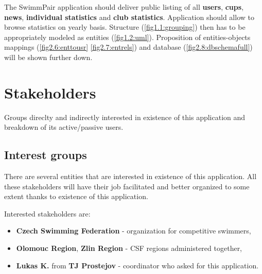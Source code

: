 The SwimmPair application should deliver public listing of all \textbf{users}, \textbf{cups}, \textbf{news}, \textbf{individual statistics} and \textbf{club statistics}. Application should allow to browse statistics on yearly basis. Structure (\autoref{fig1.1:grouping}) then has to be appropriately modeled as entities (\autoref{fig1.2:uml}). Proposition of entities-objects mappings (\autoref{fig2.6:enttousr} \autoref{fig2.7:entrels}) and database (\autoref{fig2.8:dbschemafull}) will be shown further down. 
\section{Stakeholders}
Groups direclty and indirectly interested in existence of this application and breakdown of its active/passive users.
\subsection*{Interest groups}
There are several entities that are interested in existence of this application. All these stakeholders will have their job facilitated and better organized to some extent thanks to existence of this application. \par
Interested stakeholders are:
\begin{itemize}
  \item \textbf{Czech Swimming Federation} - organization for competitive swimmers,
  \item \textbf{Olomouc Region}, \textbf{Zlin Region} - CSF regions administered together,
  \item \textbf{Lukas K.} from \textbf{TJ Prostejov} - coordinator who asked for this application.
\end{itemize}
